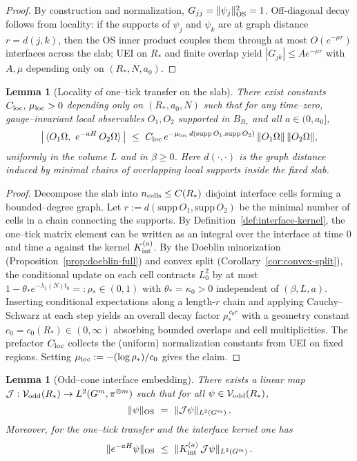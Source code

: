 \documentclass[11pt]{amsart}
\theoremstyle{plain}
\newtheorem{lemma}[theorem]{Lemma}
\theoremstyle{definition}
\theoremstyle{remark}
\begin{document}
\begin{proof}
By construction and normalization, $G_{jj}=\|\psi_j\|_{\rm OS}^2=1$. Off-diagonal decay follows from locality: if the supports of $\psi_j$ and $\psi_k$ are at graph distance $r=d(j,k)$, then the OS inner product couples them through at most $O(e^{-\mu r})$ interfaces across the slab; UEI on $R_*$ and finite overlap yield $|G_{jk}|\le A e^{-\mu r}$ with $A,\mu$ depending only on $(R_*,N,a_0)$.
\end{proof}

\begin{lemma}[Locality of one--tick transfer on the slab]\label{lem:locality-one-tick}
There exist constants $C_{\rm loc},\,\mu_{\rm loc}>0$ depending only on $(R_*,a_0,N)$ such that for any time--zero, gauge--invariant local observables $O_1,O_2$ supported in $B_{R_*}$ and all $a\in(0,a_0]$,
\[
  \big|\,\langle O_1\Omega,\ e^{-aH}\,O_2\Omega\rangle\,\big|\ \le\ C_{\rm loc}\,e^{-\mu_{\rm loc}\, d(\mathrm{supp}\,O_1,\mathrm{supp}\,O_2)}\,\|O_1\Omega\|\,\|O_2\Omega\|,
\]
uniformly in the volume $L$ and in $\beta\ge 0$. Here $d(\cdot,\cdot)$ is the graph distance induced by minimal chains of overlapping local supports inside the fixed slab.
\end{lemma}

\begin{proof}
Decompose the slab into $n_{\rm cells}\le C(R_*)$ disjoint interface cells forming a bounded--degree graph. Let $r:=d(\mathrm{supp}\,O_1,\mathrm{supp}\,O_2)$ be the minimal number of cells in a chain connecting the supports. By Definition~\ref{def:interface-kernel}, the one--tick matrix element can be written as an integral over the interface at time $0$ and time $a$ against the kernel $K_{\rm int}^{(a)}$. By the Doeblin minorization (Proposition~\ref{prop:doeblin-full}) and convex split (Corollary~\ref{cor:convex-split}), the conditional update on each cell contracts $L^2_0$ by at most $1-\theta_* e^{-\lambda_1(N) t_0}=:\rho_*\in(0,1)$ with $\theta_*=\kappa_0>0$ independent of $(\beta,L,a)$. Inserting conditional expectations along a length-$r$ chain and applying Cauchy--Schwarz at each step yields an overall decay factor $\rho_*^{\,c_0 r}$ with a geometry constant $c_0=c_0(R_*)\in(0,\infty)$ absorbing bounded overlaps and cell multiplicities. The prefactor $C_{\rm loc}$ collects the (uniform) normalization constants from UEI on fixed regions. Setting $\mu_{\rm loc}:=-(\log \rho_*)/c_0$ gives the claim.
\end{proof}

\begin{lemma}[Odd--cone interface embedding]\label{lem:odd-cone-embedding}
There exists a linear map $\mathcal J: \mathcal V_{\rm odd}(R_*)\to L^2(G^m,\pi^{\otimes m})$ such that for all $\psi\in \mathcal V_{\rm odd}(R_*)$,
\[
  \|\psi\|_{\rm OS}\ =\ \|\mathcal J \psi\|_{L^2(G^m)}\,.
\]
Moreover, for the one--tick transfer and the interface kernel one has
\[
  \|e^{-aH}\psi\|_{\rm OS}\ \le\ \|K_{\rm int}^{(a)}\, \mathcal J\psi\|_{L^2(G^m)}\,.
\]
\end{lemma}
\end{document}
